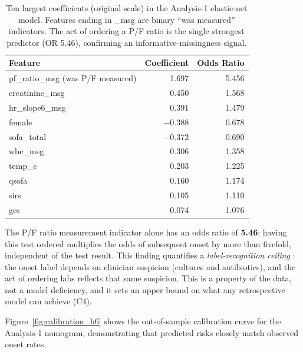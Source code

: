 \begin{table}[H]
    \centering
    \begin{tabular}{l|r|r}
        \hline
        \textbf{Feature} & \textbf{Coefficient} & \textbf{Odds Ratio} \\
        \hline\hline
        pf\_ratio\_msg (was P/F measured)  & 1.697 & 5.456 \\
        creatinine\_msg                    & 0.450 & 1.568 \\
        hr\_slope6\_msg                    & 0.391 & 1.479 \\
        female                             & $-0.388$ & 0.678 \\
        sofa\_total                        & $-0.372$ & 0.690 \\
        wbc\_msg                           & 0.306 & 1.358 \\
        temp\_c                            & 0.203 & 1.225 \\
        qsofa                              & 0.160 & 1.174 \\
        sirs                               & 0.105 & 1.110 \\
        gcs                                & 0.074 & 1.076 \\
        \hline
    \end{tabular}
    \caption{Ten largest coefficients (original scale) in the Analysis-1 elastic-net
    model. Features ending in \_msg are binary ``was measured'' indicators.
    The act of ordering a P/F ratio is the single strongest predictor
    (OR 5.46), confirming an informative-missingness signal.}
    \label{table:coefs}
\end{table}

The P/F ratio measurement indicator alone has an odds ratio of \textbf{5.46}:
having this test ordered multiplies the odds of subsequent onset by more than
fivefold, independent of the test result. This finding quantifies a
\emph{label-recognition ceiling} \cite{groenwold2020missingness}: the onset
label depends on clinician suspicion (cultures and antibiotics), and the act of
ordering labs reflects that same suspicion. This is a property of the data,
not a model deficiency, and it sets an upper bound on what any retrospective
model can achieve (C4).

Figure~\ref{fig:calibration_h6} shows the out-of-sample calibration curve for
the Analysis-1 nomogram, demonstrating that predicted risks closely match observed
onset rates.

